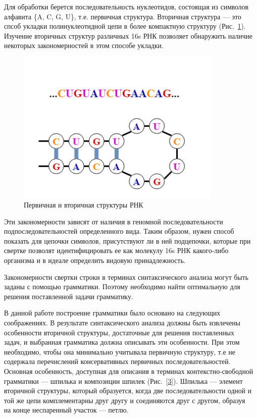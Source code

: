 \documentclass[14pt]{matmex-diploma}
\begin{document}
Для обработки берется последовательность нуклеотидов, состоящая из символов алфавита \{A, C, G, U\}, т.е. первичная структура. Вторичная структура --- это спсоб укладки полинуклеотидной цепи в более компактную структуру (Рис.~\ref{2}). Изучение вторичных структур различных 16s РНК позволяет обнаружить наличие некоторых закономерностей в этом способе укладки. 

\begin{figure}[!ht]
\centering
\includegraphics[width=10cm]{structures.png}
\caption{Первичная и вторичная структуры РНК}
\label{2}
\end{figure}

Эти закономерности зависят от наличия в геномной последовательности подпоследовательностей определенного вида. Таким образом, нужен способ показать для цепочки символов, присутствуют ли в ней подцепочки, которые при свертке позволят идентифицировать ее как молекулу 16s РНК какого-либо организма и в идеале определить видовую принадлежность.


Закономерности свертки строки в терминах синтаксического анализа могут быть заданы с помощью грамматики. Поэтому необходимо найти оптимальную для решения поставленной задачи грамматику.


В данной работе построение грамматики было основано на следующих соображениях. В результате синтаксического анализа должны быть извлечены особенности вторичной структуры, достаточные для решения поставленных задач, и выбранная грамматика должна описывать эти особенности. При этом необходимо, чтобы она минимально учитывала первичную структуру, т.е не содержала перечислений консервативных первичных последовательностей. Основная особенность, доступная для описания в терминах контекстно-свободной грамматики --- шпилька и композиции шпилек (Рис.~\ref{3}). Шпилька --- элемент вторичной структуры, который образуется, когда две последовательности одной и той же цепи комплементарны друг другу и соединяются друг с другом, образуя на конце неспаренный участок --- петлю.
\end{document}
